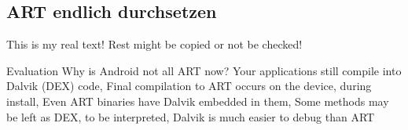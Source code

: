 \subsection{ART endlich durchsetzen} \label{subsection:evaluation-external-art}
This is my real text! Rest might be copied or not be checked!


%
Evaluation
Why is Android not all ART now? Your applications still compile into Dalvik (DEX) code, Final compilation to ART occurs on the device, during install, Even ART binaries have Dalvik embedded in them, Some methods may be left as DEX, to be interpreted, Dalvik is much easier to debug than ART\newline
\cite{andevconDalvikART}
%
